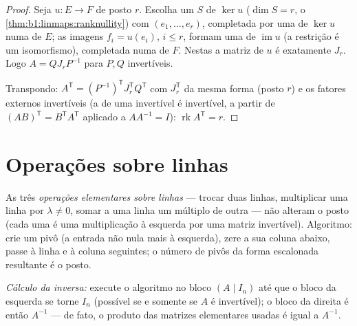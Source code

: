 \begin{proof}
Seja $u \colon E \to F$ de posto $r$. Escolha um  $S$ de $\ker u$
($\dim S = r$, o \cref{thm:b1:linmaps:ranknullity}) com  $(e_1, \dots, e_r)$, completada por uma  de $\ker u$
numa  de $E$; as imagens $f_i = u(e_i)$, $i \leq r$, formam uma  de $\operatorname{im} u$
(a restrição é um isomorfismo), completada numa  de $F$. Nestas
 a matriz de $u$ é exatamente $J_r$. Logo $A = Q J_r P^{-1}$ para $P, Q$
invertíveis.

Transpondo: $A^{\mathsf T} = (P^{-1})^{\mathsf T} J_r^{\mathsf T} Q^{\mathsf T}$ com $J_r^{\mathsf T}$ da mesma forma (posto $r$) e os fatores
externos invertíveis (a  de uma invertível é invertível, a
partir de $(AB)^{\mathsf T} = B^{\mathsf T}A^{\mathsf T}$ aplicado a $AA^{-1} = I$): $\operatorname{rk} A^{\mathsf T} = r$.
\end{proof}

\section{Operações sobre linhas}

\begin{method}\label{met:b1:matrices:gauss}
As três \emph{operações elementares sobre linhas} --- trocar duas linhas, multiplicar uma linha por
$\lambda \neq 0$, somar a uma linha um múltiplo de outra --- não alteram o
posto (cada uma é uma multiplicação à esquerda por uma matriz
invertível). Algoritmo: crie um pivô (a entrada não nula mais à
esquerda), zere a sua coluna abaixo, passe à linha e à coluna
seguintes; o número de pivôs da forma escalonada resultante é o
posto.

\emph{Cálculo da inversa:} execute o algoritmo no bloco $(A \mid
I_n)$ até
que o bloco da esquerda se torne $I_n$ (possível se e somente se $A$
é invertível); o bloco da direita é então $A^{-1}$ --- de fato, o
produto das matrizes elementares usadas é igual a $A^{-1}$.
\end{method}

